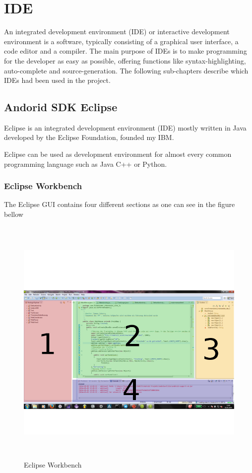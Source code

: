 \chapter{IDE}
An integrated development environment (IDE) or interactive development environment is a software, typically consisting of a graphical user interface, a code editor and a compiler. The main purpose of IDEs is to make programming for the developer as easy as possible, offering functions like syntax-highlighting, auto-complete and source-generation. The following sub-chapters describe which IDEs had been used in the project.     

\section{Andorid SDK Eclipse}

Eclipse is an integrated development environment (IDE) mostly written in Java developed by the Eclipse Foundation, founded my IBM.

Eclipse can be used as development environment for almost every common programming language such as Java C++ or Python. 

\subsection{Eclipse Workbench}
The Eclipse GUI contains four different sections as one can see in the figure bellow
\\ 
\begin{figure}[h]
\centering
\includegraphics[width=400pt,height=350pt,keepaspectratio]{graphics/eclipse.png}
\caption{Eclipse Workbench}
\end{figure}

